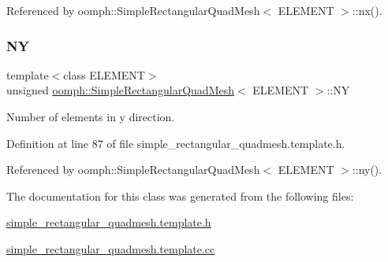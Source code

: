 Referenced by oomph\+::\+Simple\+Rectangular\+Quad\+Mesh$<$ E\+L\+E\+M\+E\+N\+T $>$\+::nx().

\mbox{\label{classoomph_1_1SimpleRectangularQuadMesh_a6db96125790b46858fb00eef46bf7201}} 
\subsubsection{\texorpdfstring{NY}{NY}}
{\footnotesize\ttfamily template$<$class E\+L\+E\+M\+E\+NT$>$ \\
unsigned \hyperlink{classoomph_1_1SimpleRectangularQuadMesh}{oomph\+::\+Simple\+Rectangular\+Quad\+Mesh}$<$ E\+L\+E\+M\+E\+NT $>$\+::NY\hspace{0.3cm}{\ttfamily [private]}}



Number of elements in y direction. 



Definition at line 87 of file simple\+\_\+rectangular\+\_\+quadmesh.\+template.\+h.



Referenced by oomph\+::\+Simple\+Rectangular\+Quad\+Mesh$<$ E\+L\+E\+M\+E\+N\+T $>$\+::ny().



The documentation for this class was generated from the following files\+:\begin{DoxyCompactItemize}
\item 
\hyperlink{simple__rectangular__quadmesh_8template_8h}{simple\+\_\+rectangular\+\_\+quadmesh.\+template.\+h}\item 
\hyperlink{simple__rectangular__quadmesh_8template_8cc}{simple\+\_\+rectangular\+\_\+quadmesh.\+template.\+cc}\end{DoxyCompactItemize}

